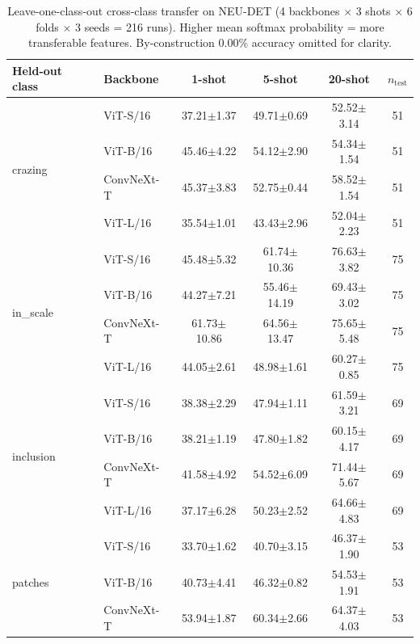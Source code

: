 \documentclass[journal]{IEEEtran}
\begin{document}
\begin{table}[!ht]
\centering
\caption{Leave-one-class-out cross-class transfer on NEU-DET (4 backbones $\times$ 3 shots $\times$ 6 folds $\times$ 3 seeds = 216 runs). Higher mean softmax probability = more transferable features. By-construction 0.00\% accuracy omitted for clarity.}
\label{tab:loco}
\begin{tabular}{llcccc}
\toprule
Held-out class & Backbone & 1-shot & 5-shot & 20-shot & $n_{\text{test}}$ \\
\midrule
\multirow{4}{*}{crazing}        & ViT-S/16     & 37.21$\pm$1.37 & 49.71$\pm$0.69 & 52.52$\pm$3.14 & 51 \\
                              & ViT-B/16     & 45.46$\pm$4.22 & 54.12$\pm$2.90 & 54.34$\pm$1.54 & 51 \\
                              & ConvNeXt-T   & 45.37$\pm$3.83 & 52.75$\pm$0.44 & 58.52$\pm$1.54 & 51 \\
                              & ViT-L/16     & 35.54$\pm$1.01 & 43.43$\pm$2.96 & 52.04$\pm$2.23 & 51 \\
\multirow{4}{*}{in\_scale}     & ViT-S/16     & 45.48$\pm$5.32 & 61.74$\pm$10.36 & 76.63$\pm$3.82 & 75 \\
                              & ViT-B/16     & 44.27$\pm$7.21 & 55.46$\pm$14.19 & 69.43$\pm$3.02 & 75 \\
                              & ConvNeXt-T   & 61.73$\pm$10.86 & 64.56$\pm$13.47 & 75.65$\pm$5.48 & 75 \\
                              & ViT-L/16     & 44.05$\pm$2.61 & 48.98$\pm$1.61 & 60.27$\pm$0.85 & 75 \\
\multirow{4}{*}{inclusion}     & ViT-S/16     & 38.38$\pm$2.29 & 47.94$\pm$1.11 & 61.59$\pm$3.21 & 69 \\
                              & ViT-B/16     & 38.21$\pm$1.19 & 47.80$\pm$1.82 & 60.15$\pm$4.17 & 69 \\
                              & ConvNeXt-T   & 41.58$\pm$4.92 & 54.52$\pm$6.09 & 71.44$\pm$5.67 & 69 \\
                              & ViT-L/16     & 37.17$\pm$6.28 & 50.23$\pm$2.52 & 64.66$\pm$4.83 & 69 \\
\multirow{4}{*}{patches}       & ViT-S/16     & 33.70$\pm$1.62 & 40.70$\pm$3.15 & 46.37$\pm$1.90 & 53 \\
                              & ViT-B/16     & 40.73$\pm$4.41 & 46.32$\pm$0.82 & 54.53$\pm$1.91 & 53 \\
                              & ConvNeXt-T   & 53.94$\pm$1.87 & 60.34$\pm$2.66 & 64.37$\pm$4.03 & 53 \\

\end{tabular}
\end{table}
\end{document}

